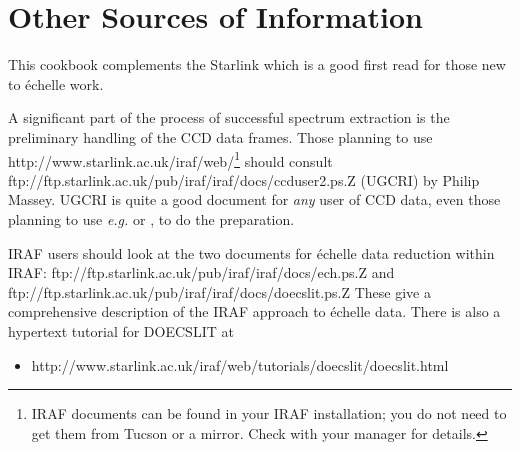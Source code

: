\documentclass[twoside,11pt]{starlink}
\providecommand{\scspec}[2]{#1}
\begin{document}
\section{\label{se_other_sources}Other Sources of
         Information}


This cookbook complements the Starlink  which is a good first read for
those new to \'{e}chelle work.

A significant part of the process of successful spectrum extraction
is the preliminary handling of the CCD data frames.
Those planning to use
%
{http://www.starlink.ac.uk/iraf/web/}\scspec{\footnote{IRAF
documents can be found in your IRAF installation; you
do not need to get them from Tucson or a mirror.  Check with your manager for
details.}}{\textbf{(All IRAF-related hyperlinks in this document are to the
UK-based Starlink IRAF mirror except \htmladdnormallink{this one}
{http://iraf.noao.edu/} which goes to the Tucson site.)}} should consult
{ftp://ftp.starlink.ac.uk/pub/iraf/iraf/docs/ccduser2.ps.Z} (UGCRI) by Philip Massey.
UGCRI is quite a good document for \emph{any} user of CCD data, even those
planning to use \emph{e.g.}  or
, to do the preparation.

IRAF users should look at the two documents for \'{e}chelle data reduction
within IRAF:
{ftp://ftp.starlink.ac.uk/pub/iraf/iraf/docs/ech.ps.Z}
and
{ftp://ftp.starlink.ac.uk/pub/iraf/iraf/docs/doecslit.ps.Z}
These give a comprehensive description of the IRAF approach to \'{e}chelle
data.  There is also a hypertext tutorial for DOECSLIT at

\begin{itemize}

\item {}
      {http://www.starlink.ac.uk/iraf/web/tutorials/doecslit/doecslit.html}

\end{itemize}
\end{document}
